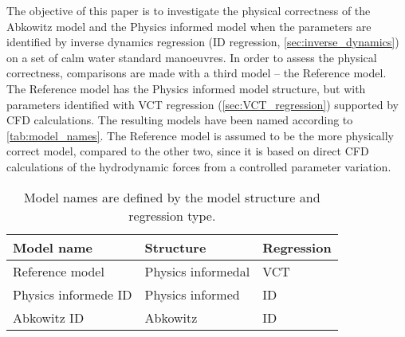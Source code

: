 The objective of this paper is to investigate the physical correctness of the Abkowitz model and the Physics informed model when the parameters are identified by inverse dynamics regression (ID regression, \autoref{sec:inverse_dynamics}) on a set of calm water standard manoeuvres. In order to assess the physical correctness, comparisons are made with a third model -- the Reference model. The Reference model has the Physics informed model structure, but with parameters identified with VCT regression (\autoref{sec:VCT_regression}) supported by CFD calculations. The resulting models have been named according to \autoref{tab:model_names}.
The Reference model is assumed to be the more physically correct model, compared to the other two, since it is based on direct CFD calculations of the hydrodynamic forces from a controlled parameter variation.
\begin{table}[h]
    \caption{Model names are defined by the model structure and regression type.}
    \label{tab:model_names}
    \centering
    \begin{tabular}{l l l}
        Model name                           & Structure      & Regression \\
        \hline
        Reference model & Physics informedal & VCT                         \\
        Physics informede ID  & Physics informed & ID         \\
        Abkowitz ID                          & Abkowitz       & ID         \\
    \end{tabular}
\end{table}